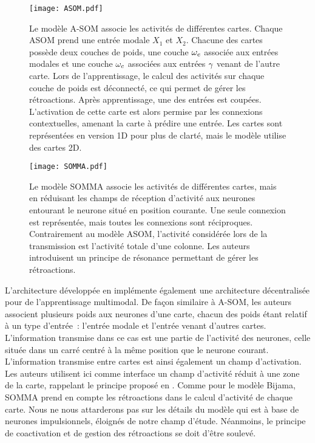 \documentclass[../main]{subfiles}
\begin{document}
{\begin{figure}
    \centering\texttt{[image: ASOM.pdf]}
    \caption{Le modèle A-SOM \cite{johnsson_associative_2009} associe les activités de différentes cartes. Chaque ASOM prend une entrée modale $X_1$ et $X_2$. Chacune des cartes possède deux couches de poids, une couche $\omega_e$ associée aux entrées modales et une couche $\omega_c$ associées aux entrées $\gamma$ venant de l'autre carte. Lors de l'apprentissage, le calcul des activités sur chaque couche de poids est déconnecté, ce qui permet de gérer les rétroactions. 
    Après apprentissage, une des entrées est coupées. L'activation de cette carte est alors permise par les connexions contextuelles, amenant la carte à prédire une entrée. Les cartes sont représentées en version 1D pour plus de clarté, mais le modèle utilise des cartes 2D.
    \label{fig:asom}}
\end{figure}

\begin{figure}
    \centering\texttt{[image: SOMMA.pdf]}
    \caption{Le modèle SOMMA \cite{lefort_unlearning_2011,lefort_apprentissage_2012} associe les activités de différentes cartes, mais en réduisant les champs de réception d'activité aux neurones entourant le neurone situé en position courante. Une seule connexion est représentée, mais toutes les connexions sont réciproques. Contrairement au modèle ASOM, l'activité considérée lors de la transmission est l'activité totale d'une colonne. Les auteurs introduisent un principe de résonance permettant de gérer les rétroactions.
    \label{fig:somma}}
\end{figure}

L'architecture développée en \cite{lefort_active_2015} implémente également une architecture décentralisée pour de l'apprentissage multimodal. De façon similaire à A-SOM, les auteurs associent plusieurs poids aux neurones d'une carte, chacun des poids étant relatif à un type d'entrée~: l'entrée modale et l'entrée venant d'autres cartes. L'information transmise dans ce cas est une partie de l'activité des neurones, celle située dans un carré centré à la même position que le neurone courant. L'information transmise entre cartes est ainsi également un champ d'activation. Les auteurs utilisent ici comme interface un champ d'activité réduit à une zone de la carte, rappelant le principe proposé en \cite{menard05}. Comme pour le modèle Bijama, SOMMA prend en compte les rétroactions dans le calcul d'activité de chaque carte.
Nous ne nous attarderons pas sur les détails du modèle qui est à base de neurones impulsionnels, éloignés de notre champ d'étude. Néanmoins, le principe de coactivation et de gestion des rétroactions se doit d'être soulevé. 


}
\end{document}
